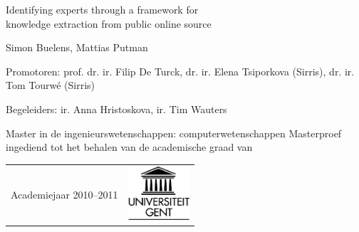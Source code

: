 

\begin{titlepage}

\setlength{\hoffset}{-1in}
\setlength{\voffset}{-1in}
\setlength{\topmargin}{1.5cm}
\setlength{\headheight}{0.5cm}
\setlength{\headsep}{1cm}
\setlength{\oddsidemargin}{3cm}
\setlength{\evensidemargin}{3cm}
\setlength{\footskip}{1.5cm}
\enlargethispage{1cm}

\fontsize{12pt}{14pt}
\selectfont

\vspace{12cm}

\fontsize{17.28pt}{21pt}
\selectfont

Identifying experts through a framework for\\
knowledge extraction from public online source

\vspace{1.5cm}

Simon Buelens, Mattias Putman

\fontsize{12pt}{14pt}
\selectfont

\vspace{5cm}

Promotoren: prof. dr. ir. Filip De Turck, dr. ir. Elena Tsiporkova (Sirris), dr. ir. Tom Tourw\'e (Sirris)

Begeleiders: ir. Anna Hristoskova, ir. Tim Wauters

\vspace{1cm}
Master in de ingenieurswetenschappen: computerwetenschappen
Masterproef ingediend tot het behalen van de academische graad van

\vspace{2.5cm}

\begin{table}[width=1.0\textwidth]
		\begin{tabular}{l r}
			
Academiejaar 2010--2011 & \includegraphics[height=2cm]{fig/ruglogo}
		\end{tabular}
\end{table}

\end{titlepage}

